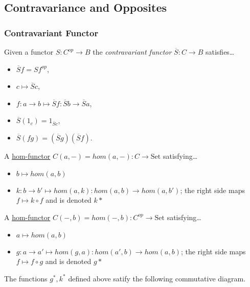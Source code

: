 \subsection{Contravariance and Opposites}\label{contravariance}

\subsubsection{Contravariant Functor}\label{contravariantfunctor}
Given a functor $S: C^{op} \rightarrow B$ the \emph{contravariant functor} $\overline{S} : C \rightarrow B$ satisfies\dots
\begin{itemize}
  \item $\overline{S}f = Sf^{op}$,
  \item $c \mapsto \overline{S}c$,
  \item $f:a \rightarrow b \mapsto \overline{S}f:\overline{S}b \rightarrow \overline{S}a$,
  \item $\overline{S}(1_c) = 1_{\overline{S}c}$,
  \item $\overline{S}(fg) = (\overline{S}g)(\overline{S}f)$.
\end{itemize}

\label{covarianthomfunctor}
A \hyperref[homfunctors]{hom-functor} $C(a,-) = hom(a,-):C \rightarrow \textrm{Set}$ satisfying\dots
\begin{itemize}
  \item $b \mapsto hom(a,b)$
  \item $k:b\rightarrow b' \mapsto hom(a,k):hom(a,b) \rightarrow hom(a,b')$; the right side maps $f \mapsto k \circ f$ and is denoted $k*$
\end{itemize}

\label{contravarianthomfunctor}
A \hyperref[homfunctors]{hom-functor} $C(-,b) = hom(-,b):C^{op} \rightarrow \textrm{Set}$ satisfying\dots
\begin{itemize}
  \item $a \mapsto hom(a,b)$
  \item $g:a\rightarrow a' \mapsto hom(g,a):hom(a',b) \rightarrow hom(a,b)$; the right side maps $f \mapsto f \circ g$ and is denoted $g*$
\end{itemize}

\noindent The functions $g^*, k^*$ defined above satify the following commutative diagram.

\begin{figure}[H]
  \centering
  
\end{figure}